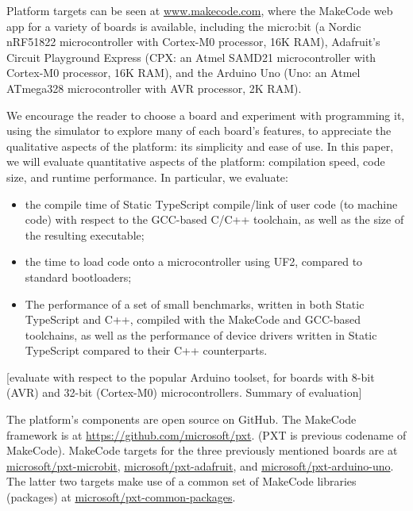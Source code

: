 Platform targets can be seen at \url{www.makecode.com}, where the MakeCode web app for a variety of boards is available, 
including the micro:bit (a Nordic nRF51822 microcontroller with Cortex-M0 processor, 16K RAM), Adafruit's Circuit 
Playground Express (CPX: an Atmel SAMD21 microcontroller with Cortex-M0 processor, 16K RAM), and the Arduino Uno 
(Uno: an Atmel ATmega328 microcontroller with AVR processor, 2K RAM). 

We encourage the reader to choose a board and experiment with programming it, using the simulator to explore many 
of each board's features, to appreciate the qualitative aspects of the platform: its simplicity and ease of use.  In this 
paper, we will evaluate quantitative aspects of the platform: 
compilation speed, code size, and runtime performance.  In particular, we evaluate:
\begin{itemize}
\item the compile time of Static TypeScript compile/link of user code (to machine code) with respect 
      to the GCC-based C/C++ toolchain, as well as the size of the resulting executable;
\item the time to load code onto a microcontroller using UF2, compared to standard bootloaders; 
\item The performance of a set of small benchmarks, written in both Static TypeScript and C++,
      compiled with the MakeCode and GCC-based toolchains, as well as the performance of device drivers
      written in Static TypeScript compared to their C++ counterparts.
\end{itemize}
[evaluate with respect to the popular Arduino toolset, for boards with 8-bit (AVR) and 32-bit (Cortex-M0) microcontrollers. 
Summary of evaluation]

The platform's components are open source on GitHub. The MakeCode framework is at \url{https://github.com/microsoft/pxt}.
(PXT is previous codename of MakeCode). 
MakeCode targets for the three previously mentioned boards are at 
\href{https://github.com/microsoft/pxt-microbit}{microsoft/pxt-microbit}, 
\href{https://github.com/microsoft/pxt-adafruit}{microsoft/pxt-adafruit}, and
\href{https://github.com/microsoft/pxt-arduino-uno}{microsoft/pxt-arduino-uno}.
The latter two targets make use of a common set of MakeCode libraries (packages) at
\href{https://github.com/microsoft/pxt-common-packages}{microsoft/pxt-common-packages}.



